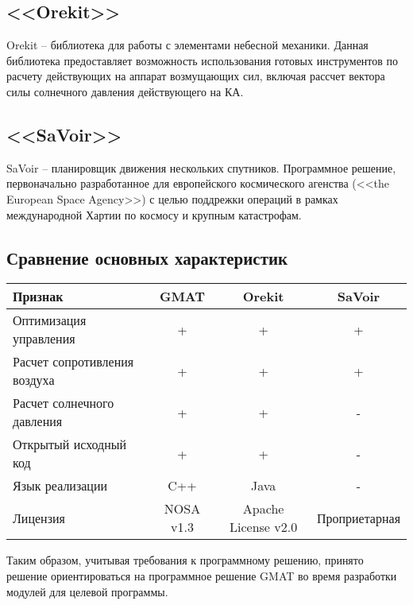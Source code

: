 \subsection{<<Orekit>>}
\noindent\indent Orekit -- библиотека для работы с элементами небесной механики.
Данная библиотека предоставляет возможность использования готовых инструментов по расчету
действующих на аппарат возмущающих сил, включая рассчет вектора силы солнечного давления
действующего на КА.
\subsection{<<SaVoir>>}
\noindent\indent SaVoir -- планировщик движения нескольких спутников. Программное
решение, первоначально разработанное для европейского космического агенства
(<<the European Space Agency>>) с целью поддрежки операций в рамках международной
Хартии по космосу и крупным катастрофам.
\subsection{Сравнение основных характеристик}
\begin{tabular}{|l|c|c|c|}
  \hline
  Признак                      & GMAT                            & Orekit              & SaVoir \\ \hline
  Оптимизация управления       & +                               & +                   & +      \\ \hline
  Расчет сопротивления воздуха & +                               & +                   & +      \\ \hline
  Расчет солнечного давления   & +                               & +                   & -      \\ \hline
  Открытый исходный код        & +                               & +                   & -      \\ \hline
  Язык реализации              & C++                             & Java                & -      \\ \hline
  Лицензия                     & NOSA v1.3 & Apache License v2.0 & Проприетарная \\ \hline
\end{tabular}\par
Таким образом, учитывая требования к программному решению, принято решение
ориентироваться на программное решение GMAT во время разработки модулей для целевой программы.
